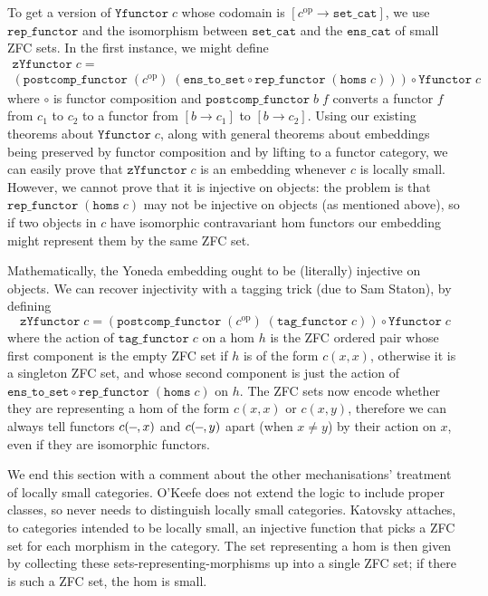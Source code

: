 \documentclass[twoside,titlepage,11pt]{article}
\begin{document}
To get a version of $\mathtt{Yfunctor}\;c$ whose codomain is $[c^\mathrm{op}\to\mathtt{set\_cat}]$, we use $\mathtt{rep\_functor}$ and the isomorphism between $\mathtt{set\_cat}$ and the $\mathtt{ens\_cat}$ of small ZFC sets.
In the first instance, we might define
\begin{multline*}
\mathtt{zYfunctor}\;c=\\(\mathtt{postcomp\_functor}\;(c^\mathrm{op})\;(\mathtt{ens\_to\_set}\circ\mathtt{rep\_functor}\;(\mathtt{homs}\;c)))\circ\mathtt{Yfunctor}\;c
\end{multline*}
where $\circ$ is functor composition and $\mathtt{postcomp\_functor}\;b\;f$ converts a functor $f$ from $c_1$ to $c_2$ to a functor from $[b\to c_1]$ to $[b\to c_2]$.
Using our existing theorems about $\mathtt{Yfunctor}\;c$, along with general theorems about embeddings being preserved by functor composition and by lifting to a functor category, we can easily prove that $\mathtt{zYfunctor}\;c$ is an embedding whenever $c$ is locally small.
However, we cannot prove that it is injective on objects: the problem is that $\mathtt{rep\_functor}\;(\mathtt{homs}\;c)$ may not be injective on objects (as mentioned above), so if two objects in $c$ have isomorphic contravariant hom functors our embedding might represent them by the same ZFC set.

Mathematically, the Yoneda embedding ought to be (literally) injective on objects.
We can recover injectivity with a tagging trick (due to Sam Staton), by defining
\[\mathtt{zYfunctor}\;c=(\mathtt{postcomp\_functor}\;(c^\mathrm{op})\;(\mathtt{tag\_functor}\;c))\circ\mathtt{Yfunctor}\;c\]
where the action of $\mathtt{tag\_functor}\;c$ on a hom $h$ is the ZFC ordered pair whose first component is the empty ZFC set if $h$ is of the form $c(x,x)$, otherwise it is a singleton ZFC set, and whose second component is just the action of $\mathtt{ens\_to\_set}\circ\mathtt{rep\_functor}\;(\mathtt{homs}\;c)$ on $h$.
The ZFC sets now encode whether they are representing a hom of the form $c(x,x)$ or $c(x,y)$, therefore we can always tell functors $c(\blank,x)$ and $c(\blank,y)$ apart (when $x\neq y$) by their action on $x$, even if they are isomorphic functors.

We end this section with a comment about the other mechanisations' treatment of locally small categories.
O'Keefe does not extend the logic to include proper classes, so never needs to distinguish locally small categories.
Katovsky attaches, to categories intended to be locally small, an injective function that picks a ZFC set for each morphism in the category.
The set representing a hom is then given by collecting these sets-representing-morphisms up into a single ZFC set; if there is such a ZFC set, the hom is small.
\end{document}
